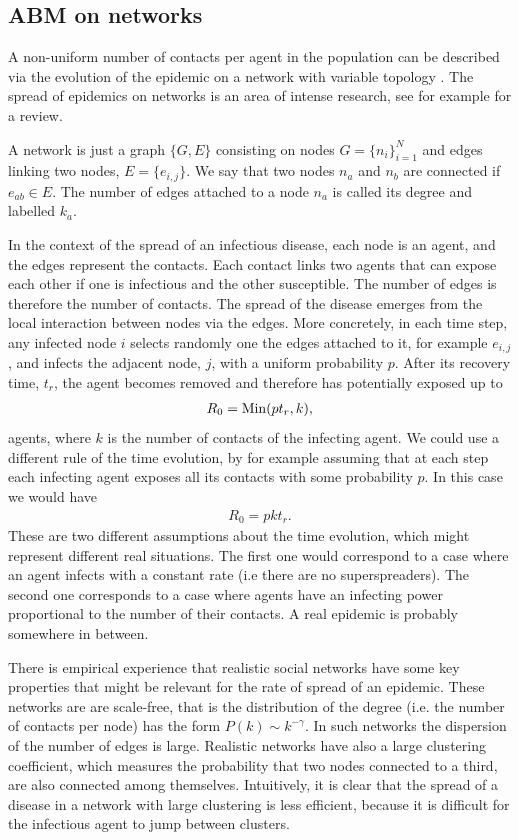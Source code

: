 \documentclass[a4paper,oneside,11pt]{article}
\begin{document}
\subsection{ABM on networks}

A non-uniform number of contacts per agent in the population can be described via the evolution of the epidemic on a network with variable topology \cite{}. The spread of epidemics on networks is an area of intense research, see for example \cite{} for a review.

A network is just a graph \(\{G,E\}\)
consisting on
nodes \(G=\{n_i\}_{i=1}^N\) and edges linking two nodes, \(E=\{e_{i,j}\}\). We say that
two nodes \(n_a\) and \(n_b\) are connected if \(e_{ab}\in E\). The number
of edges attached to a node \(n_a\) is called its degree and labelled
\(k_a\).

In the context of the spread of an infectious disease, each node is
an agent, and the edges represent the contacts. Each contact links two agents that can expose each other if one is infectious and the other susceptible. The number of edges is therefore the number of contacts. The spread of the disease emerges from the local interaction between nodes via the edges. More concretely, in each time step, any infected node $i$ selects randomly one the edges attached to it, for example $e_{i,j}$, and infects the adjacent node, $j$, with a uniform probability $p$.
After its recovery time, $t_r$, the agent becomes removed and therefore has potentially exposed up to  
\begin{eqnarray}
R_0 = {\rm Min}(p t_r, k),
\end{eqnarray}
agents, where $k$ is the number of contacts of the infecting agent. 
 We could use a different rule of the time evolution, by for example assuming that at each step each infecting agent exposes all its contacts with some probability $p$. In this case we would have
 \begin{eqnarray}
 R_0= p k t_r. 
 \end{eqnarray}
These are two different assumptions about the time evolution, which might represent different real situations. The first one would correspond to a case where an agent infects with a constant rate (i.e there are no superspreaders). The second one corresponds to a case where agents have an infecting power proportional to the number of their contacts. A real epidemic is probably somewhere in between.

 There is empirical experience that realistic social networks have some key properties that might be relevant for the rate of spread of an epidemic.  These networks are are scale-free, that is the distribution of the degree (i.e. the number of contacts per node) has the form \(P(k)\sim k^{-\gamma}\). In such networks the dispersion of the number of edges is large. Realistic networks have also a large clustering coefficient, which measures the probability that two nodes connected to a third, are also connected among themselves. Intuitively, it is clear that the spread of a disease in a network with large clustering is less efficient, because it is difficult for the infectious agent to jump between clusters.
\end{document}
